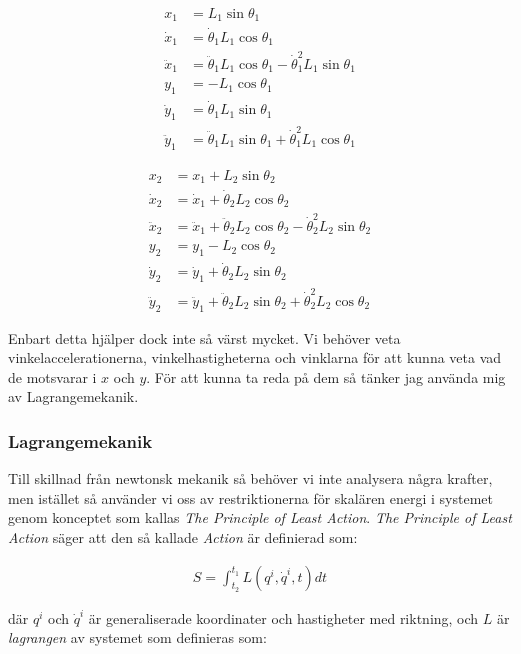 \documentclass[10pt, a4paper]{amsart}
\begin{document}
\begin{align}
    x_1 &= L_1\sin\theta_1 \\
    \dot x_1 &= \dot \theta_1L_1\cos \theta_1 \\
    \ddot x_1 &= \ddot \theta_1L_1\cos \theta_1 - \dot \theta_1^2L_1\sin \theta_1 \\
    y_1 &= -L_1\cos\theta_1 \\
    \dot y_1 &= \dot \theta_1L_1\sin \theta_1 \\
    \ddot y_1 &= \ddot \theta_1L_1\sin \theta_1 + \dot \theta_1^2L_1\cos \theta_1
\end{align}

\begin{align}
    x_2 &= x_1 + L_2\sin\theta_2 \\
    \dot x_2 &= \dot x_1 + \dot \theta_2L_2\cos \theta_2 \\
    \ddot x_2 &= \ddot x_1 + \ddot \theta_2L_2\cos \theta_2 - \dot \theta_2^2L_2\sin \theta_2 \\
    y_2 &= y_1 -L_2\cos\theta_2 \\
    \dot y_2 &= \dot y_1 + \dot \theta_2L_2\sin \theta_2 \\
    \ddot y_2 &= \ddot y_1 + \ddot \theta_2L_2\sin \theta_2 + \dot \theta_2^2L_2\cos \theta_2
\end{align} \bigskip 

Enbart detta hjälper dock inte så värst mycket. 
Vi behöver veta vinkelaccelerationerna, 
vinkelhastigheterna och vinklarna för att kunna veta vad de motsvarar i $ x $ och $ y $.
För att kunna ta reda på dem så tänker jag använda mig av Lagrangemekanik.

\subsubsection*{\textbf{Lagrangemekanik}}
\hspace{5ex} 

Till skillnad från newtonsk mekanik så behöver vi inte analysera några krafter, 
men istället så använder vi oss av restriktionerna för skalären energi i systemet genom konceptet som kallas \textit{The Principle of Least Action}.
\textit{The Principle of Least Action} säger att den så kallade \textit{Action} är definierad som: \bigskip 

\begin{align}
    S = \int_{t_2}^{t_1} L(q^{i}, \dot q^{i}, t)dt
\end{align} \bigskip 

där $ q^{i} $ och $ \dot q^{i} $ är generaliserade koordinater och hastigheter med riktning, 
och $ L $ är \textit{lagrangen} av systemet som definieras som: \bigskip 
\end{document}
